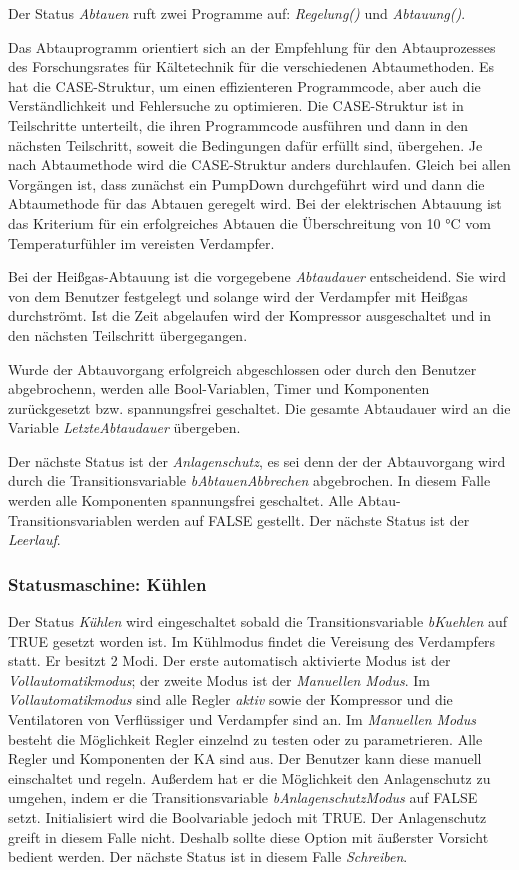 Der Status \textit{Abtauen} ruft zwei Programme auf:\textit{ Regelung()} und \textit{Abtauung()}. 

Das Abtauprogramm orientiert sich  an der Empfehlung für den Abtauprozesses des Forschungsrates für Kältetechnik für die verschiedenen Abtaumethoden. Es hat die CASE-Struktur, um einen effizienteren Programmcode, aber auch die Verständlichkeit und Fehlersuche zu optimieren. Die CASE-Struktur ist in Teilschritte unterteilt, die ihren Programmcode ausführen und dann in den nächsten Teilschritt, soweit die Bedingungen dafür erfüllt sind,  übergehen. Je nach Abtaumethode wird die CASE-Struktur anders durchlaufen. Gleich  bei allen Vorgängen ist, dass zunächst ein PumpDown durchgeführt wird und dann die Abtaumethode für das Abtauen geregelt wird. Bei der elektrischen Abtauung ist das Kriterium für ein erfolgreiches Abtauen die Überschreitung von 10 °C vom Temperaturfühler im vereisten Verdampfer. 

Bei der Heißgas-Abtauung ist die vorgegebene \textit{Abtaudauer} entscheidend. Sie wird von dem Benutzer festgelegt und solange wird der Verdampfer mit Heißgas durchströmt. Ist die Zeit abgelaufen wird der Kompressor ausgeschaltet und in den nächsten Teilschritt übergegangen. 

Wurde der Abtauvorgang erfolgreich abgeschlossen oder durch den Benutzer abgebrochenn, werden alle Bool-Variablen, Timer und Komponenten zurückgesetzt bzw. spannungsfrei geschaltet. Die gesamte Abtaudauer wird an die Variable \textit{LetzteAbtaudauer} übergeben. 


Der nächste Status ist der \textit{Anlagenschutz}, es sei denn der der Abtauvorgang wird durch die Transitionsvariable \textit{bAbtauenAbbrechen} abgebrochen. In diesem Falle werden alle Komponenten spannungsfrei geschaltet. Alle Abtau-Transitionsvariablen werden auf FALSE gestellt. Der nächste Status ist der \textit{Leerlauf}. 

\subsubsection*{Statusmaschine: Kühlen}

Der Status \textit{Kühlen} wird eingeschaltet sobald die Transitionsvariable \textit{bKuehlen} auf TRUE gesetzt worden ist. Im Kühlmodus findet die Vereisung des Verdampfers statt. Er besitzt 2 Modi. Der erste automatisch aktivierte Modus ist der \textit{Vollautomatikmodus}; der zweite Modus ist der \textit{Manuellen Modus}. 
Im \textit{Vollautomatikmodus} sind alle Regler \textit{aktiv} sowie der Kompressor und die Ventilatoren von Verflüssiger und Verdampfer sind an. 
Im \textit{Manuellen Modus} besteht die Möglichkeit Regler einzelnd zu testen oder zu parametrieren. Alle Regler und Komponenten der KA sind aus. Der Benutzer kann diese manuell einschaltet und regeln. Außerdem hat er die Möglichkeit den Anlagenschutz zu umgehen, indem er die Transitionsvariable \textit{bAnlagenschutzModus} auf FALSE setzt. Initialisiert wird die Boolvariable jedoch mit TRUE. Der Anlagenschutz greift in diesem Falle nicht. Deshalb sollte diese Option mit äußerster Vorsicht bedient werden. Der nächste Status ist in diesem Falle \textit{Schreiben}. 

